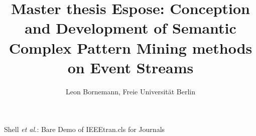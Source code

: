 \documentclass[journal]{IEEEtran}
\begin{document}
%
\title{Master thesis Espose: Conception and Development of Semantic Complex Pattern Mining methods on Event Streams}
%
%
%

\author{Leon Bornemann, Freie Universit\"at Berlin}

% 
%



%
{Shell \MakeLowercase{\textit{et al.}}: Bare Demo of IEEEtran.cls for Journals}
% 




\end{document}
